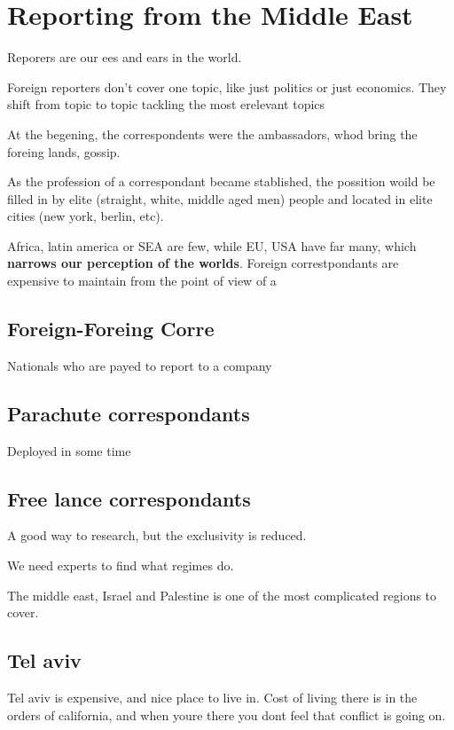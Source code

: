 
\section{Reporting from the Middle East}

Reporers are our ees and ears in the world.

Foreign reporters don't cover one topic, like just politics or just economics. They shift from topic to topic tackling the most erelevant topics

At the begening, the correspondents were the ambassadors, whod bring the foreing lands, gossip.

As the profession of a correspondant became stablished, the possition woild be filled in by elite (straight, white, middle aged men) people and located in elite cities (new york, berlin, etc).

Africa, latin america or SEA are few, while EU, USA have far many, which \textbf{narrows our perception of the worlds}. Foreign correstpondants are expensive to maintain from the point of view of a 

\subsection{Foreign-Foreing Corre}
Nationals who are payed to report to a company

\subsection{Parachute correspondants} 
Deployed in some time

\subsection{Free lance correspondants}
A good way to research, but the exclusivity is reduced.


We need experts to find what regimes do.

The middle east, Israel and Palestine is one of the most complicated regions to cover. 

\subsection{Tel aviv}

Tel aviv is expensive, and nice place to live in. Cost of living there is in the orders of california, and when youre there you dont feel that conflict is going on.


